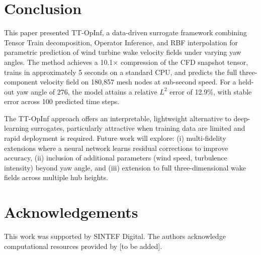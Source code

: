 \documentclass[12pt]{article}
\begin{document}
\section{Conclusion}
\label{sec:conclusion}

This paper presented TT-OpInf, a data-driven surrogate framework combining Tensor Train decomposition, Operator Inference, and RBF interpolation for parametric prediction of wind turbine wake velocity fields under varying yaw angles.
The method achieves a 10.1$\times$ compression of the CFD snapshot tensor, trains in approximately 5 seconds on a standard CPU, and predicts the full three-component velocity field on 180{,}857 mesh nodes at sub-second speed.
For a held-out yaw angle of 276\textdegree, the model attains a relative $L^2$ error of 12.9\%, with stable error across 100 predicted time steps.

The TT-OpInf approach offers an interpretable, lightweight alternative to deep-learning surrogates, particularly attractive when training data are limited and rapid deployment is required.
Future work will explore: (i) multi-fidelity extensions where a neural network learns residual corrections to improve accuracy, (ii) inclusion of additional parameters (wind speed, turbulence intensity) beyond yaw angle, and (iii) extension to full three-dimensional wake fields across multiple hub heights.


\section*{Acknowledgements}
This work was supported by SINTEF Digital. The authors acknowledge computational resources provided by [to be added].



\end{document}
